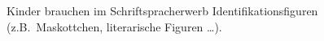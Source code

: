 Kinder brauchen im Schriftspracherwerb Identifikationsfiguren (z.B.\ Maskottchen, literarische Figuren \ldots).